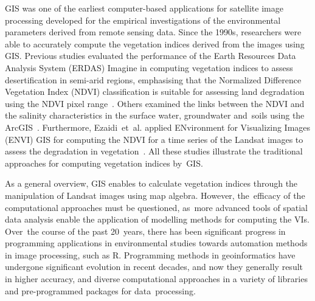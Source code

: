 \documentclass[jimaging,article,accept,pdftex,moreauthors]{Definitions/mdpi}
\begin{document}
GIS was one of the earliest computer-based applications for satellite image processing developed for the empirical investigations of the environmental parameters derived from remote sensing data. Since the 1990s, researchers were able to accurately compute the vegetation indices derived from the images using GIS. Previous studies evaluated the performance of the Earth Resources Data Analysis System (ERDAS) %
 Imagine in computing vegetation indices to assess desertification in semi-arid regions, emphasising that the Normalized Difference Vegetation Index (NDVI) classification is suitable for assessing land degradation using the NDVI pixel range~\cite{KUMAR2022100578}. Others examined the links between the NDVI and the salinity characteristics in the surface water, groundwater and~soils using the ArcGIS~\cite{RASHID2023100314}. Furthermore, Ezaidi~et~al. applied ENvironment for Visualizing Images (ENVI) GIS for computing the NDVI for a time series of the Landsat images to assess the degradation in vegetation~\cite{EZAIDI2022100800}. All these studies illustrate the traditional approaches for computing vegetation indices by~GIS.

As a general overview, GIS enables to calculate vegetation indices through the manipulation of Landsat images using map algebra. However, the~efficacy of the computational approaches must be questioned, as~more advanced tools of spatial data analysis enable the application of modelling methods for computing the VIs. Over~the course of the past \mbox{20 years}, there has been significant progress in programming applications in environmental studies towards automation methods in image processing, such as R. Programming methods in geoinformatics have undergone significant evolution in recent decades, and now they generally result in higher accuracy, and diverse computational approaches in a variety of libraries and pre-programmed packages for data~processing. 
\end{document}
